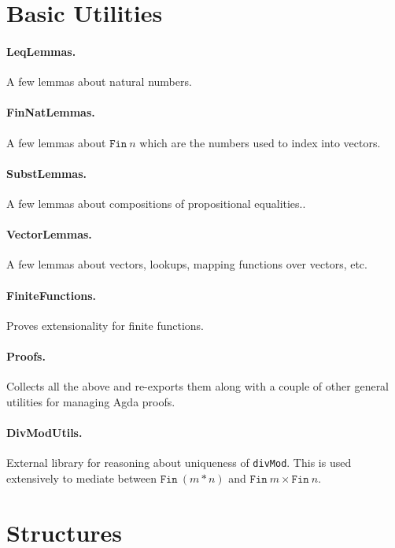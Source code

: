 \documentclass{article}
\begin{document}
\section{Basic Utilities}

\paragraph*{LeqLemmas.} A few lemmas about natural numbers. 

\paragraph*{FinNatLemmas.} A few lemmas about $\texttt{Fin}~n$ which
are the numbers used to index into vectors.

\paragraph*{SubstLemmas.} A few lemmas about compositions of
propositional equalities..

\paragraph*{VectorLemmas.} A few lemmas about vectors, lookups,
mapping functions over vectors, etc.

\paragraph*{FiniteFunctions.} Proves extensionality for finite functions. 

\paragraph*{Proofs.} Collects all the above and re-exports them along
with a couple of other general utilities for managing Agda proofs.

\paragraph*{DivModUtils.} External library for reasoning about
uniqueness of \texttt{divMod}. This is used extensively to mediate
between $\texttt{Fin}~(m*n)$ and
$\texttt{Fin}~m \times \texttt{Fin}~n$.

\section{Structures}
\end{document}
